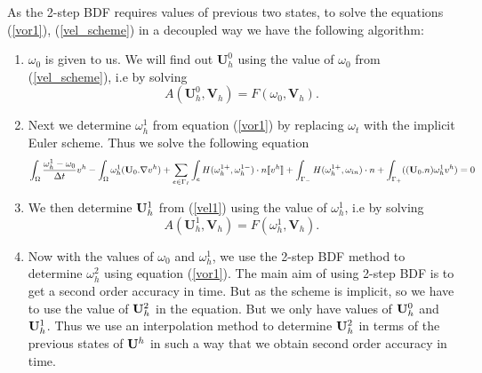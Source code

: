 \documentclass[11pt]{article}
\begin{document}
As the 2-step BDF requires values of previous two states, to solve the equations (\ref{vor1}), (\ref{vel_scheme}) in a decoupled way we have the following algorithm:
\begin{enumerate}
 \item $\omega_0$ is given to us. We will find out $\textbf{U}_h^0$ using the value of $\omega_0$ from (\ref{vel_scheme}),
 i.e by solving
 $$
 A(\textbf{U}^0_h,\textbf{V}_h)=F(\omega_0,\textbf{V}_h).
 $$
 \item Next we determine $\omega^1_h$ from equation (\ref{vor1}) by replacing $\omega_t$ with the implicit Euler scheme. 
Thus we solve the following equation
 $$
 \int_\Omega\frac{\omega^1_h-\omega_0}{\Delta{t}}{v^h}
-\int_\Omega\omega^1_h({{\bf{U}}_0}.\nabla{v^h})
+\displaystyle{\sum_{e\in\Gamma_I}}\int_e H(\omega^{1+}_h,\omega^{1-}_h)\cdot{n}\text{\textlbrackdbl{$v^h$}\textrbrackdbl}\\
+\int_{\Gamma_-}H(\omega^{1+}_h,\omega_{in})\cdot{n}
+\int_{\Gamma_+}(({\bf{U}}_0.n)\omega^1_h{v^h})=0
$$
\item We then determine ${\bf{U}}_h^1$ from (\ref{vel1}) using the value of $\omega^1_h$, i.e by solving
$$
A(\textbf{U}^1_h,\textbf{V}_h)=F(\omega_h^1,\textbf{V}_h).
$$
\item Now with the values of $\omega_0$ and $\omega^1_h$, we use the 2-step BDF method to determine $\omega_h^2$ using equation (\ref{vor1}). The main aim of using 2-step BDF is to get a second 
order accuracy in time. But as the scheme is implicit, so we have to use the value of ${\bf{U}}^2_h$ in the equation.
But we only have values of ${\bf{U}}^0_h$ and ${\bf{U}}^1_h$. Thus we use an interpolation method to determine
${\bf{U}}^2_h$ in terms of the previous states of ${\bf{U}}^h$ in such a way that we obtain second order accuracy in time.


\end{enumerate}
\end{document}
